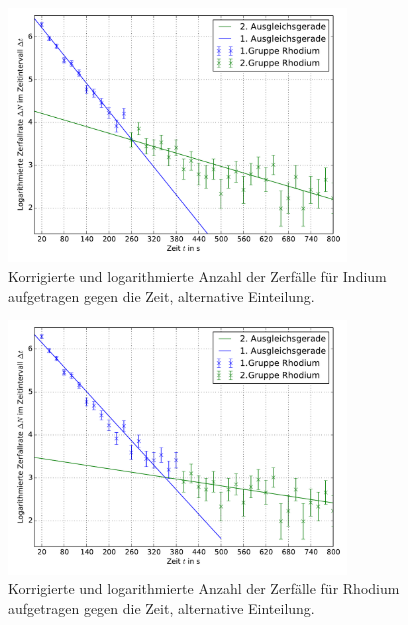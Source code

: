\begin{figure}[p]
    \centering
    \includegraphics[width=0.8\textwidth]{Bilder/rhodium_1.pdf}
    \caption{Korrigierte und logarithmierte Anzahl der Zerfälle für Indium aufgetragen gegen die Zeit, alternative Einteilung.}
    \label{fig:rhodium1}
\end{figure}
\begin{figure}[p]
    \centering
    \includegraphics[width=0.8\textwidth]{Bilder/rhodium_2.pdf}
    \caption{Korrigierte und logarithmierte Anzahl der Zerfälle für Rhodium aufgetragen gegen die Zeit, alternative Einteilung.}
    \label{fig:rhodium2}
\end{figure} 